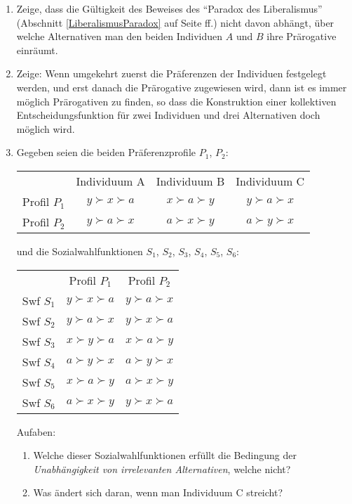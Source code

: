 \begin{enumerate}
  \item \label{AufgPL1} Zeige, dass die Gültigkeit des Beweises des "`Paradox
  des Liberalismus"' (Abschnitt \ref{LiberalismusParadox} auf Seite
  \pageref{LiberalismusParadox}ff.) nicht davon abhängt, über welche
  Alternativen man den beiden Individuen $A$ und $B$ ihre Prärogative einräumt.
  
  \item \label{AufgPL2} Zeige: Wenn umgekehrt zuerst die Präferenzen der
  Individuen festgelegt werden, und erst danach die Prärogative zugewiesen wird, 
  dann ist es immer
  möglich Prärogativen zu finden, so dass die Konstruktion einer
  kollektiven Entscheidungsfunktion für zwei Individuen und drei Alternativen
  doch möglich wird.

  \item \label{AufgArrow1} Gegeben seien die beiden Präferenzprofile $P_1$,
  $P_2$:
  \begin{center}
  \begin{tabular}{cccc}
                &  Individuum A         & Individuum B        & Individuum C \\
  Profil $P_1$  &  $y \succ x \succ a$  & $x \succ a \succ y$ & $y \succ a \succ x$ \\ 
  Profil $P_2$  &  $y \succ a \succ x$  & $a \succ x \succ y$ & $a \succ y \succ x$ \\
  \end{tabular}
  \end{center}
  und die Sozialwahlfunktionen $S_1$, $S_2$, $S_3$, $S_4$, $S_5$, $S_6$:
  \begin{center}
  \begin{tabular}{ccc}
               &  Profil $P_1$        & Profil $P_2$        \\
  Swf $S_1$    &  $y \succ x \succ a$ & $y \succ a \succ x$ \\  %
  Swf $S_2$    &  $y \succ a \succ x$ & $y \succ x \succ a$ \\  %
  Swf $S_3$    &  $x \succ y \succ a$ & $x \succ a \succ y$ \\  %
  Swf $S_4$    &  $a \succ y \succ x$ & $a \succ y \succ x$ \\  %
  Swf $S_5$    &  $x \succ a \succ y$ & $a \succ x \succ y$ \\  %
  Swf $S_6$    &  $a \succ x \succ y$ & $y \succ x \succ a$ \\  %
  \end{tabular}
  \end{center}
  Aufaben:
  \begin{enumerate}
  \item Welche dieser Sozialwahlfunktionen erfüllt die Bedingung der
        {\em Unabhängigkeit von irrelevanten Alternativen}, welche nicht?
  \item Was ändert sich daran, wenn man Individuum C streicht?
  \end{enumerate}
 

\end{enumerate}
